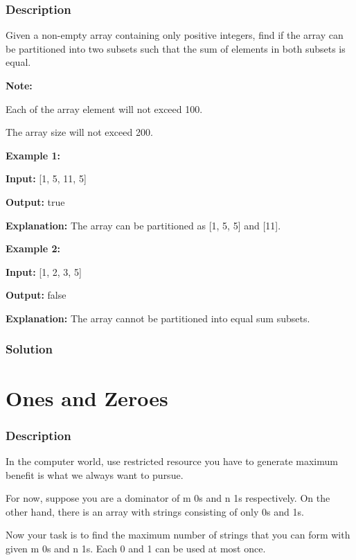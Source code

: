 \subsubsection{Description}
Given a non-empty array containing only positive integers, find if the array can be partitioned into two subsets such that the sum of elements in both subsets is equal.

\textbf{Note:}

Each of the array element will not exceed 100.

The array size will not exceed 200.

\textbf{Example 1:}

\textbf{Input:} [1, 5, 11, 5]

\textbf{Output:} true

\textbf{Explanation:} The array can be partitioned as [1, 5, 5] and [11].

\textbf{Example 2:}

\textbf{Input:} [1, 2, 3, 5]

\textbf{Output:} false

\textbf{Explanation:} The array cannot be partitioned into equal sum subsets.

\subsubsection{Solution}

\begin{Code}

\end{Code}

\newpage

\section{Ones and Zeroes} %

\subsubsection{Description}
In the computer world, use restricted resource you have to generate maximum benefit is what we always want to pursue.

For now, suppose you are a dominator of m 0s and n 1s respectively. On the other hand, there is an array with strings consisting of only 0s and 1s.

Now your task is to find the maximum number of strings that you can form with given m 0s and n 1s. Each 0 and 1 can be used at most once.

